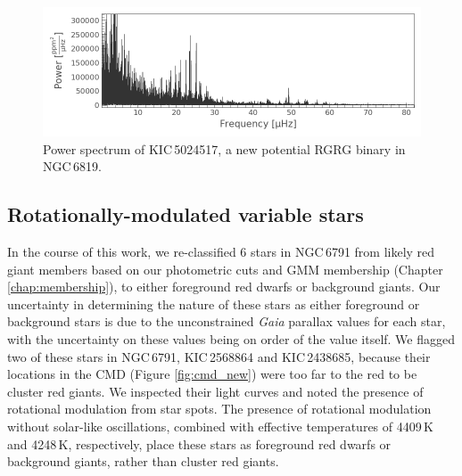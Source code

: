 \begin{figure}
    \centering
    \includegraphics[width=\linewidth]{Chapter5/5024517_ps.png}
    \caption[Power spectrum of the new potential RG\textendash{}RG binary, KIC\,5024517]{Power spectrum of KIC\,5024517, a new potential RG\textendash{}RG binary in NGC\,6819.}
    \label{fig:5024517_ps}
\end{figure}

\subsection{Rotationally-modulated variable stars}

In the course of this work, we re-classified 6 stars in NGC\,6791 from likely red giant members based on our photometric cuts and GMM membership (Chapter \ref{chap:membership}), to either foreground red dwarfs or background giants. Our uncertainty in determining the nature of these stars as either foreground or background stars is due to the unconstrained {\em Gaia} parallax values for each star, with the uncertainty on these values being on order of the value itself. We flagged two of these stars in NGC\,6791, KIC\,2568864 and KIC\,2438685, because their locations in the CMD (Figure \ref{fig:cmd_new}) were too far to the red to be cluster red giants. We inspected their light curves and noted the presence of rotational modulation from star spots. The presence of rotational modulation without solar-like oscillations, combined with effective temperatures of 4409\,K and 4248\,K, respectively, place these stars as foreground red dwarfs or background giants, rather than cluster red giants. 

